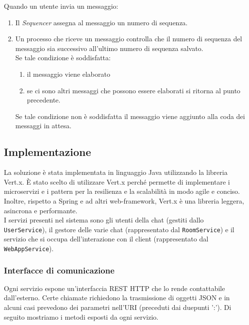 \documentclass[a4paper]{article}
\begin{document}
Quando un utente invia un messaggio:
\begin{enumerate}
    \item Il \textit{Sequencer} assegna al messaggio un numero di sequenza. 
    \item Un processo che riceve un messaggio controlla che il numero di sequenza del messaggio sia successivo all'ultimo numero di sequenza salvato.\\
    Se tale condizione è soddisfatta:
    \begin{enumerate}
        \item il messaggio viene elaborato
        \item se ci sono altri messaggi che possono essere elaborati si ritorna al punto precedente.
    \end{enumerate}
    Se tale condizione non è soddisfatta il messaggio viene aggiunto alla coda dei messaggi in attesa.
\end{enumerate}


\subsection{Implementazione}\label{implementazione}

La soluzione è stata implementata in linguaggio Java utilizzando la libreria Vert.x. \`E stato scelto di utilizzare Vert.x perché permette di implementare i microservizi e i pattern per la resilienza e la scalabilità in modo agile e conciso. Inoltre, rispetto a Spring e ad altri web-framework, Vert.x è una libreria leggera, asincrona e performante.\\
I servizi presenti nel sistema sono gli utenti della chat (gestiti dallo \texttt{UserService}), il gestore delle varie chat (rappresentato dal \texttt{RoomService}) e il servizio che si occupa dell'interazione con il client (rappresentato dal \texttt{WebAppService}).
 
\subsubsection{Interfacce di comunicazione}\label{interfacce-di-comunicazione}

Ogni servizio espone un'interfaccia REST HTTP che lo rende contattabile dall'esterno. Certe chiamate richiedono la trasmissione di oggetti JSON e in alcuni casi prevedono dei parametri nell'URI (preceduti dai duepunti ':').  
Di seguito mostriamo i metodi esposti da ogni servizio.
\end{document}
